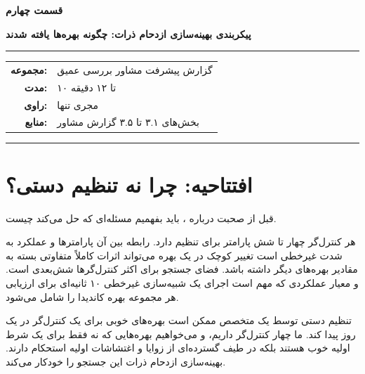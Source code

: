 \documentclass[12pt, a4paper]{article}
\newcommand{\dash}{\lr{---}}
\begin{document}

\thispagestyle{empty}

\vspace*{1.2cm}

{\centering
{\color{seriesblue}\fontsize{24}{30}\selectfont\bfseries قسمت چهارم}

\vspace{0.5cm}
{\fontsize{15}{20}\selectfont\bfseries پيکربندی بهينه‌سازی ازدحام ذرات: چگونه بهره‌ها يافته شدند}

\vspace{0.9cm}
{\color{seriesblue}\rule{0.55\linewidth}{1pt}}
\vspace{0.7cm}

{\normalsize
\begin{tabular}{rl}
  \textbf{مجموعه:}     & گزارش پيشرفت مشاور \dash{} بررسی عمیق \\[5pt]
  \textbf{مدت:}        & ۱۰ تا ۱۲ دقیقه \\[5pt]
  \textbf{راوی:}       & مجری تنها \\[5pt]
  \textbf{منابع:}      & بخش‌های ۳.۱ تا ۳.۵ گزارش مشاور \\
\end{tabular}
}

\vspace{0.9cm}
{\color{seriesblue}\rule{0.55\linewidth}{0.4pt}}
\par}

\vspace{1.2cm}

\section{افتتاحیه: چرا نه تنظيم دستی؟}

قبل از صحبت درباره ، بايد بفهميم مسئله‌ای که حل می‌کند چيست.

هر کنترل‌گر چهار تا شش پارامتر برای تنظيم دارد. رابطه بين آن پارامترها و عملکرد به شدت غيرخطی است \dash{} تغيير کوچک در يک بهره می‌تواند اثرات کاملاً متفاوتی بسته به مقادير بهره‌های ديگر داشته باشد. فضای جستجو برای اکثر کنترل‌گرها شش‌بعدی است. و معيار عملکردی که مهم است اجرای يک شبيه‌سازی غيرخطی ۱۰ ثانيه‌ای برای ارزيابی هر مجموعه بهره کانديدا را شامل می‌شود.

تنظيم دستی توسط يک متخصص ممکن است بهره‌های خوبی برای يک کنترل‌گر در يک روز پيدا کند. ما چهار کنترل‌گر داريم، و می‌خواهيم بهره‌هايی که نه فقط برای يک شرط اوليه خوب هستند بلکه در طيف گسترده‌ای از زوايا و اغتشاشات اوليه استحکام دارند. بهينه‌سازی ازدحام ذرات \dash{}  \dash{} اين جستجو را خودکار می‌کند.
\end{document}
